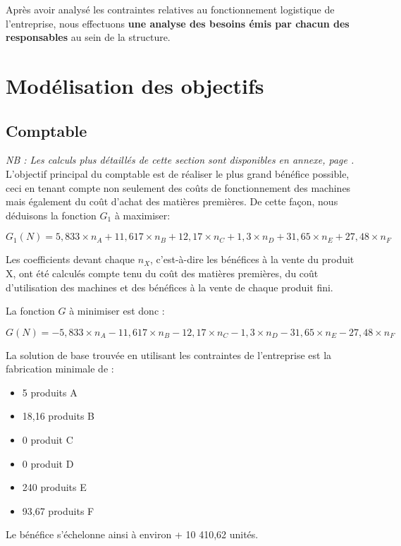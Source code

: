 \documentclass[a4paper,10pt]{article}
\begin{document}
Après avoir analysé les contraintes relatives au fonctionnement logistique de l'entreprise, nous effectuons \textbf{une analyse des besoins émis par chacun des responsables} au sein de la structure.


\section{Modélisation des objectifs}


\subsection{Comptable}

\emph{NB : Les calculs plus détaillés de cette section sont disponibles en annexe, page \pageref{annexe}.} \\

L'objectif principal du comptable est de réaliser le plus grand bénéfice possible, ceci en tenant compte non seulement des coûts de fonctionnement des machines mais également du coût d'achat des matières premières. De cette façon, nous déduisons la fonction $G_1$ à maximiser:

$$G_1(N) = 5,833 \times n_A + 11,617 \times n_B + 12,17 \times n_C + 1,3 \times n_D + 31,65 \times n_E + 27,48 \times n_F$$

Les coefficients devant chaque $n_X$, c'est-à-dire les bénéfices à la vente du produit X, ont été calculés compte tenu du coût des matières premières, du coût d'utilisation des machines et des bénéfices à la vente de chaque produit fini.\newline


La fonction $G$ à minimiser est donc :

$$G(N) = -5,833 \times n_A - 11,617 \times n_B - 12,17 \times n_C - 1,3 \times n_D - 31,65 \times n_E - 27,48 \times n_F$$

La solution de base trouvée en utilisant les contraintes de l'entreprise est la fabrication minimale de :\newline
\begin{itemize}
\item[\textbullet] 5 produits A
\item[\textbullet] 18,16 produits B
\item[\textbullet] 0 produit C
\item[\textbullet] 0 produit D
\item[\textbullet] 240 produits E
\item[\textbullet] 93,67 produits F\newline
\end{itemize}
Le bénéfice s'échelonne ainsi à environ + 10 410,62 unités.\newline
\end{document}
